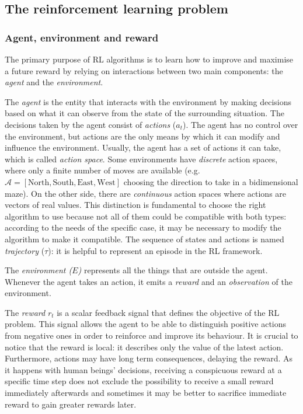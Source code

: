 \subsection{The reinforcement learning problem}

\subsubsection{Agent, environment and reward}

The primary purpose of RL algorithms is to learn how to improve and maximise a future reward by relying on interactions between two main components: the \textit{agent} and the \textit{environment}.

The \textit{agent} is the entity that interacts with the environment by making decisions based on what it can observe from the state of the surrounding situation.
The decisions taken by the agent consist of \textit{actions} ($a_t$).
The agent has no control over the environment, but actions are the only means by which it can modify and influence the environment.
Usually, the agent has a set of actions it can take, which is called \textit{action space}.
Some environments have \textit{discrete} action spaces, where only a finite number of moves are available (e.g.\ $\mathcal{A} = [\text{North}, \text{South}, \text{East}, \text{West}]$ choosing the direction to take in a bidimensional maze).
On the other side, there are \textit{continuous} action spaces where actions are vectors of real values.
This distinction is fundamental to choose the right algorithm to use because not all of them could be compatible with both types: according to the needs of the specific case, it may be necessary to modify the algorithm to make it compatible.
The sequence of states and actions is named \textit{trajectory} ($\tau$): it is helpful to represent an episode in the RL framework.

The \textit{environment ($E$)} represents all the things that are outside the agent.
Whenever the agent takes an action, it emits a \textit{reward} and an \textit{observation} of the environment.

The \textit{reward} $r_t$ is a scalar feedback signal that defines the objective of the RL problem.
This signal allows the agent to be able to distinguish positive actions from negative ones in order to reinforce and improve its behaviour.
It is crucial to notice that the reward is local: it describes only the value of the latest action.
Furthermore, actions may have long term consequences, delaying the reward.
As it happens with human beings' decisions, receiving a conspicuous reward at a specific time step does not exclude the possibility to receive a small reward immediately afterwards and sometimes it may be better to sacrifice immediate reward to gain greater rewards later.

